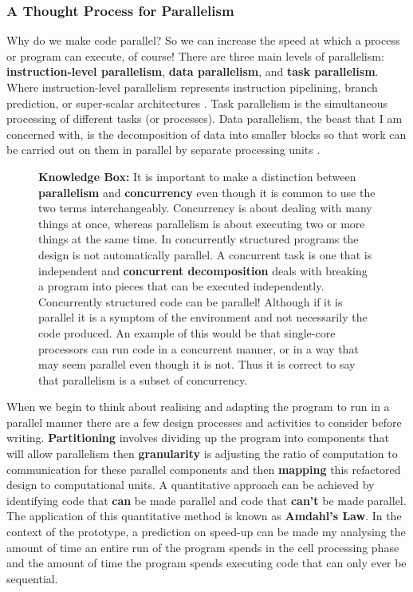 \documentclass[11pt]{article} %
\begin{document}
\subsubsection{A Thought Process for Parallelism}
Why do we make code parallel? So we can increase the speed at which a process or program can execute, of course! There are three main levels of parallelism: {\bf instruction-level parallelism}, {\bf data parallelism}, and {\bf task parallelism}. Where instruction-level parallelism represents instruction pipelining, branch prediction, or super-scalar architectures \cite[p41]{ref10}. Task parallelism is the simultaneous processing of different tasks (or processes). Data parallelism, the beast that I am concerned with, is the decomposition of data into smaller blocks so that work can be carried out on them in parallel by separate processing units \cite[A-17]{ref10}.
\begin{figure}[h]
\begin{mdframed}
{\bf Knowledge Box:} It is important to make a distinction between {\bf parallelism} and {\bf concurrency} even though it is common to use the two terms interchangeably. Concurrency is about dealing with many things at once, whereas parallelism is about executing two or more things at the same time. In concurrently structured programs the design is not automatically parallel. A concurrent task is one that is independent and {\bf concurrent decomposition} deals with breaking a program into pieces that can be executed independently.  Concurrently structured code can be parallel! Although if it is parallel it is a symptom of the environment and not necessarily the code produced. An example of this would be that single-core processors can run code in a concurrent manner, or in a way that may seem parallel even though it is not. \cite{ref12} Thus it is correct to say that parallelism is a subset of concurrency. 
\end{mdframed}
\end{figure}
When we begin to think about realising and adapting the program to run in a parallel manner there are a few design processes and activities to consider before writing. {\bf Partitioning} involves dividing up the program into components that will allow parallelism then {\bf granularity} is adjusting the ratio of computation to communication for these parallel components and then {\bf mapping} this refactored design to computational units. \cite[p77,78]{ref9} A quantitative approach can be achieved by identifying code that {\bf can} be made parallel and code that {\bf can't} be made parallel. The application of this quantitative method is known as {\bf Amdahl's Law}. In the context of the prototype, a prediction on speed-up can be made my analysing the amount of time an entire run of the program spends in the cell processing phase and the amount of time the program spends executing code that can only ever be sequential.
\end{document}
